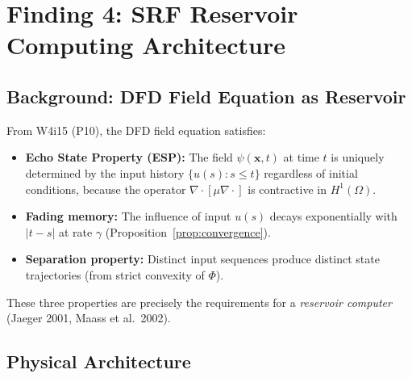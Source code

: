 \documentclass[11pt]{article}
\theoremstyle{definition}
\theoremstyle{remark}
\begin{document}
\section{Finding 4: SRF Reservoir Computing Architecture}
\label{sec:reservoir}

\subsection{Background: DFD Field Equation as Reservoir}

From W4i15 (P10), the DFD field equation satisfies:
\begin{itemize}
  \item \textbf{Echo State Property (ESP):} The field $\psi(\mathbf{x}, t)$
    at time $t$ is uniquely determined by the input history
    $\{u(s) : s \leq t\}$ regardless of initial conditions, because
    the operator $\nabla \cdot [\mu \nabla \cdot]$ is contractive in
    $H^1(\Omega)$.
  \item \textbf{Fading memory:} The influence of input $u(s)$ decays
    exponentially with $|t - s|$ at rate $\gamma$ (Proposition~\ref{prop:convergence}).
  \item \textbf{Separation property:} Distinct input sequences produce
    distinct state trajectories (from strict convexity of $\Phi$).
\end{itemize}
These three properties are precisely the requirements for a
\emph{reservoir computer} (Jaeger 2001, Maass et al.\ 2002).

\subsection{Physical Architecture}
\end{document}
